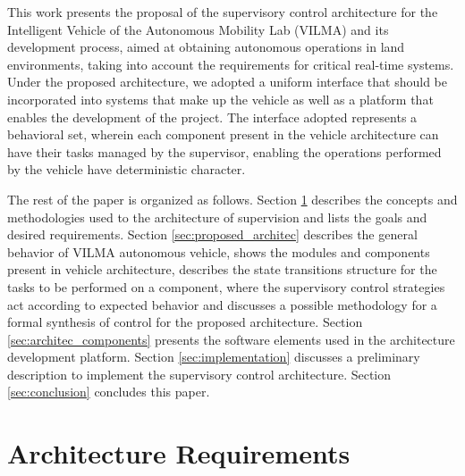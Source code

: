 \documentclass[conference]{IEEEtran}
\begin{document}
This work presents the proposal of the supervisory control architecture for the Intelligent Vehicle of the Autonomous Mobility Lab (VILMA) \cite{lma_vilma_website} and its development process, aimed at obtaining autonomous operations in land environments, taking into account the requirements for critical real-time systems. Under the proposed architecture, we adopted a uniform interface that should be incorporated into systems that make up the vehicle as well as a platform that enables the development of the project. The interface adopted represents a behavioral set, wherein each component present in the vehicle architecture can have their tasks managed by the supervisor, enabling the operations performed by the vehicle have deterministic character.

The rest of the paper is organized as follows. Section \ref{sec:architec_riquirements} describes the concepts and methodologies used to the architecture of supervision and lists the goals and desired requirements. Section \ref{sec:proposed_architec} describes the general behavior of VILMA autonomous vehicle, shows the modules and components present in vehicle architecture, describes the state transitions structure for the tasks to be performed on a component, where the supervisory control strategies act according to expected behavior and discusses a possible methodology for a formal synthesis of control for the proposed architecture. Section \ref{sec:architec_components} presents the software elements used in the architecture development platform.
Section \ref{sec:implementation} discusses a preliminary description to implement the supervisory control architecture. Section \ref{sec:conclusion} concludes this paper.

\section{Architecture Requirements}\label{sec:architec_riquirements}

\end{document}
